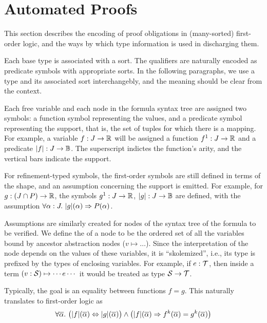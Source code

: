 \section{Automated Proofs}

This section describes the encoding of proof obligations in (many-sorted) first-order logic,
and the ways by which type information is used in discharging them.

Each base type is associated with a sort. The qualifiers are naturally encoded
as predicate symbols with appropriate sorts. In the following paragraphs, we
use a type and its associated sort interchangebly, and the meaning should be clear
from the context.

Each free variable and each node in the formula syntax tree are assigned two
symbols: a function symbol representing the values, and a predicate symbol
representing the support, that is, the set of tuples for which there is a mapping.
For example, a variable $f : J\to\R$ will be assigned a function $f^1: J\to\R$
and a predicate $|f|: J\to\B$. The superscript indictes the function's arity,
and the vertical bars indicate the support.

For refinement-typed symbols, the first-order symbols are still defined in terms
of the shape, and an assumption concerning the support is emitted. For example,
for $g: (J\cap P)\to\R$, the symbols $g^1:J\to\R$, $|g|:J\to\B$ are defined,
with the assumption $\forall \alpha:J.~|g|(\alpha)\limplies P(\alpha)$.

Assumptions are similarly created for nodes of the syntax tree of the formula to
be verified. We define the  of a node to be the ordered set of
all the variables bound by ancestor abstraction nodes ($v\mapsto\ldots$). Since
the interpretation of the node depends on the values of these variables, it is
``skolemized'', i.e., its type is prefixed by the types of enclosing variables.
For example, if $e:\T$, then inside a term $(v:\S)\mapsto \cdots e\cdots$ it would be treated as
type $\S\to\T$.

Typically, the goal is an equality between functions $f=g$. This naturally translates
to first-order logic as
\[\forall\overline{\alpha}.~\big(|f|(\overline\alpha)\liff|g|(\overline\alpha)\big) \land
  \big(|f|(\overline\alpha) \limplies f^k(\overline\alpha)=g^k(\overline\alpha)\big)\]

